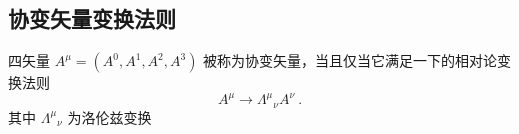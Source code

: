 

\subsection{协变矢量变换法则}
四矢量 $A^\mu=(A^0,A^1,A^2,A^3)$ 被称为协变矢量，当且仅当它满足一下的相对论变换法则
\begin{equation}
A^\mu\rightarrow \Lambda^{\mu}{}_\nu A^\nu~.
\end{equation}
其中 $\Lambda^\mu{}_\nu$ 为洛伦兹变换